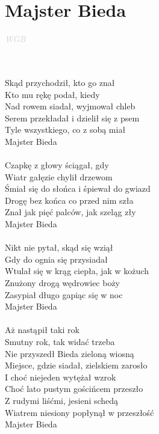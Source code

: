 \documentclass[a5paper, 10pt]{book}
\begin{document}
\newpage
\section{Majster Bieda}\textcolor{lightgray}{\textit{WGB}}\\~\\
\begin{minipage}[t]{0.7\textwidth}
~\\
Skąd przychodził, kto go znał\\
Kto mu rękę podał, kiedy\\
Nad rowem siadał, wyjmował chleb\\
Serem przekładał i dzielił się z psem\\
Tyle wszystkiego, co z sobą miał\\
Majster Bieda\\
\\
Czapkę z głowy ściągał, gdy\\
Wiatr gałęzie chylił drzewom\\
Śmiał się do słońca i śpiewał do gwiazd\\
Drogę bez końca co przed nim szła\\
Znał jak pięć palców, jak szeląg zły\\
Majster Bieda\\
\\
Nikt nie pytał, skąd się wziął\\
Gdy do ognia się przysiadał\\
Wtulał się w krąg ciepła, jak w kożuch\\
Znużony drogą wędrowiec boży\\
Zasypiał długo gapiąc się w noc\\
Majster Bieda\\
\\
Aż nastąpił taki rok\\
Smutny rok, tak widać trzeba\\
Nie przyszedł Bieda zieloną wiosną\\
Miejsce, gdzie siadał, zielskiem zarosło\\
I choć niejeden wytężał wzrok\\
Choć lato pustym gościńcem przeszło\\
Z rudymi liśćmi, jesieni schedą\\
Wiatrem niesiony popłynął w przeszłość\\
Majster Bieda\\
\end{minipage}
\end{document}
